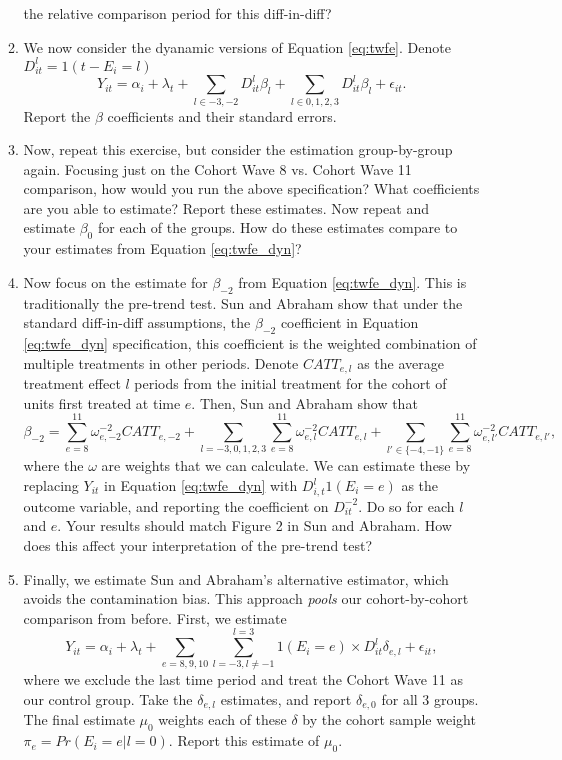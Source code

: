 \documentclass[11pt, a4paper]{article}
\begin{document}
\begin{enumerate}
\begin{enumerate}
    the relative comparison period for this diff-in-diff? 
  \item We now consider the dyanamic versions of Equation
    \ref{eq:twfe}. Denote $D_{it}^{l} = 1(t - E_{i} = l)$
    \begin{equation}\label{eq:twfe_dyn}
      Y_{it} = \alpha_{i} + \lambda_{t} + \sum_{l \in -3,-2} D^{l}_{it}\beta_{l} +  \sum_{l \in 0,1,2,3} D^{l}_{it}\beta_{l} + \epsilon_{it}.
    \end{equation}
    Report the $\beta$ coefficients and their standard errors.
  \item Now, repeat this exercise, but consider the estimation
    group-by-group again. Focusing just on the Cohort Wave 8
    vs. Cohort Wave 11 comparison, how would you run the above
    specification? What coefficients are you able to estimate? Report
    these estimates. Now repeat and estimate $\beta_{0}$ for each of
    the groups. How do these estimates compare to your estimates from
    Equation \ref{eq:twfe_dyn}?
  \item Now focus on the estimate for $\beta_{-2}$ from Equation
    \ref{eq:twfe_dyn}. This is traditionally the pre-trend test. Sun
    and Abraham show that under the standard diff-in-diff assumptions,
    the $\beta_{-2}$ coefficient in Equation \ref{eq:twfe_dyn}
    specification, this coefficient is the weighted combination of
    multiple treatments in other periods. Denote $CATT_{e,l}$ as the
    average treatment effect $l$ periods from the initial treatment
    for the cohort of units first treated at time $e$. Then, Sun and Abraham show that
    \begin{equation}
      \beta_{-2} = \sum_{e=8}^{11}\omega_{e,-2}^{-2}CATT_{e,-2} + \sum_{l=-3,0,1,2,3}\sum_{e=8}^{11}\omega_{e,l}^{-2}CATT_{e,l} + \sum_{l'\in\{-4,-1\}}\sum_{e=8}^{11}\omega_{e,l'}^{-2}CATT_{e,l'}, 
    \end{equation}
    where the $\omega$ are weights that we can calculate. We can
    estimate these by replacing $Y_{it}$ in Equation \ref{eq:twfe_dyn}
    with $D_{i,t}^{l}1(E_{i}=e)$ as the outcome variable, and
    reporting the coefficient on $D^{-2}_{it}$. Do so for each $l$ and
    $e$. Your results should match Figure 2 in Sun and Abraham. How
    does this affect your interpretation of the pre-trend test?
  \item Finally, we estimate Sun and Abraham's alternative estimator,
    which avoids the contamination bias. This approach \emph{pools}
    our cohort-by-cohort comparison from before. First, we estimate
    \begin{equation}
      Y_{it} = \alpha_{i} + \lambda_{t} + \sum_{e = 8,9,10} \sum_{l =-3, l \not=-1}^{l=3} 1(E_{i} = e) \times D^{l}_{it}\delta_{e,l} + \epsilon_{it},
    \end{equation}
    where we exclude the last time period and treat the Cohort Wave 11
    as our control group. Take the $\delta_{e,l}$ estimates, and
    report $\delta_{e,0}$ for all 3 groups. The final estimate
    $\mu_{0}$ weights each of these $\delta$ by the cohort sample
    weight $\pi_{e} = Pr(E_{i} = e | l = 0)$. Report this estimate of
    $\mu_{0}$.
  \end{enumerate}
\end{enumerate}
\end{document}
